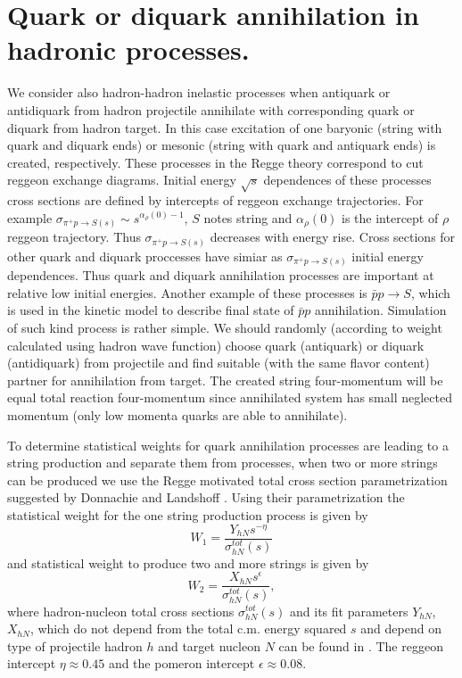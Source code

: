 \section{Quark or diquark annihilation in hadronic processes.}

\hspace{1.0em}
We consider also hadron-hadron inelastic processes when antiquark or 
antidiquark from hadron projectile annihilate with corresponding quark 
or diquark from hadron target.
In this case excitation of one baryonic (string with quark and diquark 
ends) or mesonic (string with quark and antiquark ends) is created, 
respectively. These processes in the Regge theory correspond to cut 
reggeon exchange diagrams. Initial energy $\sqrt{s}$ 
dependences of these processes 
cross sections are defined by  intercepts of reggeon exchange trajectories.
For example $\sigma_{\pi^{+}p\rightarrow S(s)} \sim s^{\alpha_{\rho}(0)-1}$, 
$S$ notes string and $\alpha_{\rho}(0)$ is the intercept of $\rho$ reggeon 
trajectory. Thus $\sigma_{\pi^{+}p\rightarrow S(s)}
$ decreases with energy 
rise. Cross sections for other quark and diquark proccesses have simiar 
as $\sigma_{\pi^{+}p\rightarrow S(s)}$ initial energy dependences. 
Thus quark and diquark annihilation processes are important at 
relative low initial energies. Another example of these processes is 
$\bar{p}p \rightarrow S$, which is used in the kinetic model to describe 
final state of $\bar{p}p$ annihilation.
Simulation of such kind process is rather simple. We should randomly 
(according to weight calculated using hadron wave function)
choose quark (antiquark) or diquark (antidiquark) from projectile and 
find suitable (with the same flavor content) partner for annihilation 
from target. The created string four-momentum will be equal total reaction 
four-momentum since annihilated system has small neglected momentum (only 
low momenta quarks are able to annihilate).
 
To determine statistical weights for 
 quark annihilation processes are leading to a string production 
and separate them from processes, when two or more strings can be produced we 
use the Regge motivated total cross section parametrization suggested by
Donnachie and Landshoff \cite{DL92}. Using their parametrization the
statistical weight for the one string production process is given by
\begin{equation}
\label{OSE1} W_{1} = \frac{Y_{hN}s^{-\eta}}{\sigma^{tot}_{hN}(s)}
\end{equation}
and statistical weight to produce two and more strings is given by 
\begin{equation}
\label{OSE2} W_{2} = \frac{X_{hN}s^{\epsilon}}{\sigma^{tot}_{hN}(s)},
\end{equation}
where hadron-nucleon total cross sections  $\sigma^{tot}_{hN}(s)$ and its 
fit parameters $Y_{hN}$, $X_{hN}$, which do not depend 
from the total c.m. energy squared $s$ and depend on type of
projectile hadron $h$ and target nucleon $N$ can be found in \cite{PDG96}. 
The reggeon intercept $\eta \approx 
0.45$ and the pomeron intercept $\epsilon \approx 0.08$.
